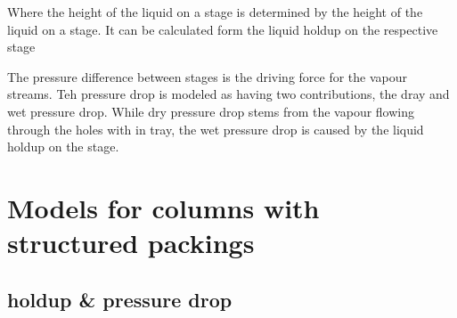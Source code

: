     Where the height of the liquid on a stage is determined by the height of the liquid on a
    stage. It can be calculated form the liquid holdup on the respective stage

    The pressure difference between stages is the driving force for the vapour streams. Teh pressure drop
    is modeled as having two contributions, the dray and wet pressure drop. While dry pressure drop
    stems from the vapour flowing through the holes with in tray, the wet pressure drop is caused by the liquid
    holdup on the stage.


\section{Models for columns with structured packings}

    \subsection{holdup \& pressure drop}

